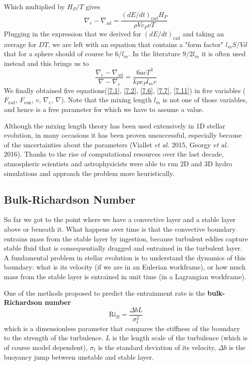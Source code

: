 Which multiplied by $H_P/T$ gives
\begin{equation}
\nabla_e - \nabla_{\mathrm{ad}} =  \frac{\left( dE/dt \right)_{ \mathrm{rad} } H_P}{\rho V c_P v T}
\end{equation}
Plugging in the expression that we derived for $(dE/dt)_{\mathrm{rad}}$ and taking an average for $DT$, we are left with an equation that contains a "form factor" $l_m S/Vd$ that for a sphere should of course be $6/l_m$. In the literature $9/2l_m$ it is often used instead and this brings us to
\begin{equation}\label{7.11}
\frac{\nabla_e - \nabla_{\mathrm{ad}}}{\nabla - \nabla_e} = \frac{6acT^3}{k \rho c_P l_m v}
\end{equation}
We finally obtained five equations(\ref{7.1}, \ref{7.2}, \ref{7.6}, \ref{7.7}, \ref{7.11}) in five variables ($F_{\mathrm{rad}}$, $F_{\mathrm{con}}$, $v$, $\nabla_e$, $\nabla$). Note that the mixing length $l_m$ is not one of those variables, and hence is a free parameter for which we have to assume a value. 

Although the mixing length theory has been used extensively in 1D stellar evolution, in many occasions it has been proven unsuccessful, especially because of the uncertainties about the parameters (Viallet \emph{et al.} 2015, Georgy \emph{et al.} 2016). Thanks to the rise of computational resources over the last decade, atmospheric scientists and astrophysicists were able to run 2D and 3D hydro simulations and approach the problem more heuristically.


\subsection{Bulk-Richardson Number}

So far we got to the point where we have a convective layer and a stable layer above or beneath it. What happens over time is that the convective boundary entrains mass from the stable layer by ingestion, because turbulent eddies capture stable fluid that is consequentially dragged and entrained in the turbulent layer. A fundamental problem in stellar evolution is to understand the dynamics of this boundary: what is its velocity (if we are in an Eulerian workframe), or how much mass from the stable layer is entrained in unit time (in a Lagrangian workframe).

One of the methods proposed to predict the entrainment rate is the \textbf{bulk-Richardson number}
\begin{equation}\label{bulkrichardson}
	\mathrm{Ri}_{B}=\frac{\Delta b L}{\sigma_t^2}
\end{equation}
which is a dimensionless parameter that compares the stiffness of the boundary to the strength of the turbulence. $L$ is the length scale of the turbulence (which is of course model dependent), $\sigma_t$ is the standard deviation of its velocity, $\Delta b$ is the buoyancy jump between unstable and stable layer.

